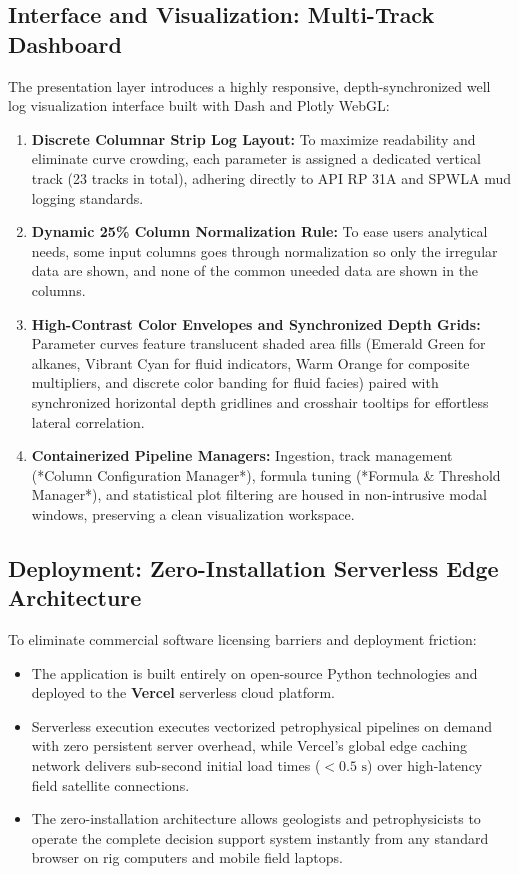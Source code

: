 \subsection{Interface and Visualization: Multi-Track Dashboard}
The presentation layer introduces a highly responsive, depth-synchronized well log visualization interface built with Dash and Plotly WebGL:
\begin{enumerate}
    \item \textbf{Discrete Columnar Strip Log Layout:} To maximize readability and eliminate curve crowding, each parameter is assigned a dedicated vertical track (23 tracks in total), adhering directly to API RP 31A and SPWLA mud logging standards.
    \item \textbf{Dynamic 25\% Column Normalization Rule:} To ease users analytical needs, some input columns goes through normalization so only the irregular data are shown, and none of the common uneeded data are shown in the columns.
    \item \textbf{High-Contrast Color Envelopes and Synchronized Depth Grids:} Parameter curves feature translucent shaded area fills (Emerald Green for alkanes, Vibrant Cyan for fluid indicators, Warm Orange for composite multipliers, and discrete color banding for fluid facies) paired with synchronized horizontal depth gridlines and crosshair tooltips for effortless lateral correlation.
    \item \textbf{Containerized Pipeline Managers:} Ingestion, track management (*Column Configuration Manager*), formula tuning (*Formula & Threshold Manager*), and statistical plot filtering are housed in non-intrusive modal windows, preserving a clean visualization workspace.
\end{enumerate}

\subsection{Deployment: Zero-Installation Serverless Edge Architecture}
To eliminate commercial software licensing barriers and deployment friction:
\begin{itemize}
    \item The application is built entirely on open-source Python technologies and deployed to the \textbf{Vercel} serverless cloud platform.
    \item Serverless execution executes vectorized petrophysical pipelines on demand with zero persistent server overhead, while Vercel's global edge caching network delivers sub-second initial load times ($< 0.5\text{ s}$) over high-latency field satellite connections.
    \item The zero-installation architecture allows geologists and petrophysicists to operate the complete decision support system instantly from any standard browser on rig computers and mobile field laptops.
\end{itemize}
